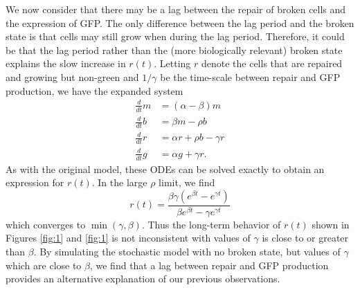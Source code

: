 \documentclass{article}
\begin{document}


We now consider that there may be a lag between the repair of broken cells and the expression of GFP. The only difference between the lag period and the broken state is that cells may still grow when during the lag period. Therefore, it could be that the lag period rather than the (more biologically relevant) broken state explains the slow increase in $r(t)$. Letting $r$ denote the cells that are repaired and growing but non-green and $1/\gamma$ be the time-scale between repair and GFP production, we have the expanded system 
\begin{align}\label{mbg_ode_lag}
\frac{d}{dt}m &= (\alpha - \beta) m\\
\frac{d}{dt}b &= \beta m - \rho b\\
\frac{d}{dt}r &= \alpha r +  \rho b - \gamma r\\
\frac{d}{dt}g &= \alpha g + \gamma r. 
\end{align}
As with the original model, these ODEs can be solved exactly to obtain an expression for $r(t)$. In the large $\rho$ limit, we find
\begin{equation}
r(t) = \frac{\beta  \gamma  \left(e^{\beta  t}-e^{\gamma  t}\right)}{\beta  e^{\beta  t}-\gamma 
   e^{\gamma  t}}
\end{equation}
which converges to $\min(\gamma,\beta)$.  Thus the long-term behavior of $r(t)$ shown in Figures \ref{fig:1} and \ref{fig:1} is not inconsistent with values of $\gamma$ is close to or greater than $\beta$. By simulating the stochastic model with no broken state, but values of $\gamma$ which are close to $\beta$, we find that a lag between repair and GFP production provides an alternative explanation of our previous observations. 
\end{document}
